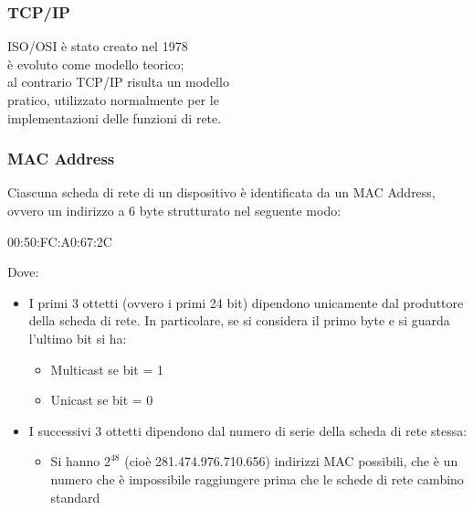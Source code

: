 \documentclass[aspectratio=169]{beamer}
\begin{document}
    \begin{frame}
      \frametitle{TCP/IP}%
      
      
      ISO/OSI è stato creato nel 1978\\è evoluto come modello teorico;\\ al contrario TCP/IP risulta un modello\\ pratico, utilizzato normalmente per le\\ implementazioni delle funzioni di rete.
    \end{frame}
    
    \begin{frame}
        \frametitle{MAC Address}
        Ciascuna scheda di rete di un dispositivo è identificata da un MAC Address, ovvero un indirizzo a 6 byte strutturato nel seguente modo:
        \begin{center}
            00:50:FC:A0:67:2C
        \end{center}
        Dove:
        \begin{itemize}
            \item I primi 3 ottetti (ovvero i primi 24 bit) dipendono unicamente dal produttore della scheda di rete. In particolare, se si considera il primo byte e si guarda l'ultimo bit si ha:
            \begin{itemize}
                [square]
                \item Multicast se bit = 1
                \item Unicast se bit = 0
            \end{itemize}
            \item I successivi 3 ottetti dipendono dal numero di serie della scheda di rete stessa:
            \begin{itemize}
                \item Si hanno $2^{48}$ (cioè 281.474.976.710.656) indirizzi MAC possibili, che è un numero che è impossibile raggiungere prima che le schede di rete cambino standard
            \end{itemize}
        \end{itemize}
    \end{frame}
    
\end{document}
